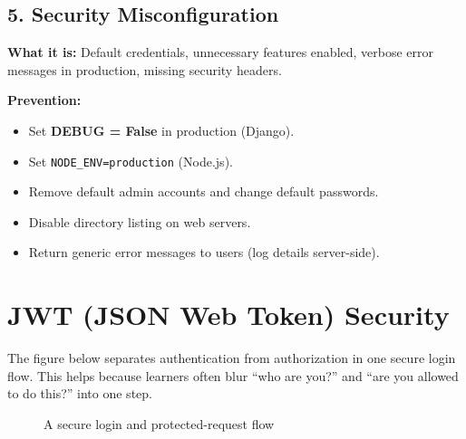 \documentclass[12pt, a4paper, oneside]{book}
\begin{document}
\subsection{5. Security Misconfiguration}

\textbf{What it is:} Default credentials, unnecessary features enabled, verbose error messages in production, missing security headers.

\textbf{Prevention:}
\begin{itemize}[leftmargin=2em]
    \item Set \textbf{DEBUG = False} in production (Django).
    \item Set \texttt{NODE\_ENV=production} (Node.js).
    \item Remove default admin accounts and change default passwords.
    \item Disable directory listing on web servers.
    \item Return generic error messages to users (log details server-side).
\end{itemize}

\section{JWT (JSON Web Token) Security}

The figure below separates authentication from authorization in one secure login flow. This helps because learners often blur ``who are you?'' and ``are you allowed to do this?'' into one step.

\begin{figure}[H]
\centering
{}
\caption{A secure login and protected-request flow}
\label{fig:secure-login-flow}
\end{figure}
\end{document}
